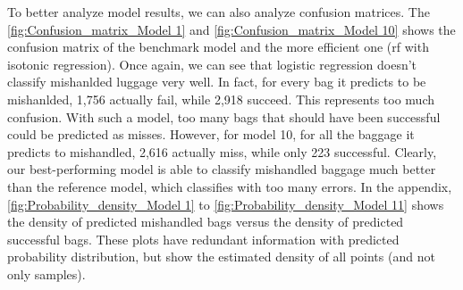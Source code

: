 \documentclass[12pt]{article}
\begin{document}
To better analyze model results, we can also analyze confusion matrices. 
The \autoref{fig:Confusion_matrix_Model 1} and \autoref{fig:Confusion_matrix_Model 10} shows the confusion matrix of the benchmark model and the more efficient one (\acrshort{rf} with isotonic regression). Once again, we can see that logistic regression doesn't classify mishanlded luggage very well. In fact, for every bag it predicts to be mishanlded, 1,756 actually fail, while 2,918 succeed. This represents too much confusion. With such a model, too many bags that should have been successful could be predicted as misses.  However, for model 10, for all the baggage it predicts to mishandled, 2,616 actually miss, while only 223 successful. Clearly, our best-performing model is able to classify mishandled baggage much better than the reference model, which classifies with too many errors. 
In the appendix, \autoref{fig:Probability_density_Model 1} to \autoref{fig:Probability_density_Model 11} shows the density of predicted mishandled bags versus the density of predicted successful bags. These plots have redundant information with predicted probability distribution, but show the estimated density of all points (and not only samples). 
\FloatBarrier
\end{document}
